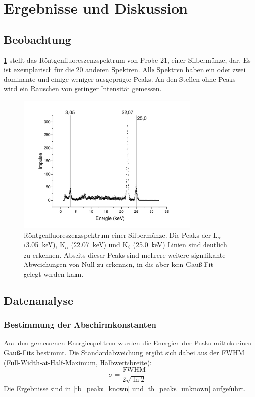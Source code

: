 \documentclass[
	a4paper,
	12pt,
	pagesize,
	ngerman
]{scrartcl}
\begin{document}
	\section{Ergebnisse und Diskussion}


	\subsection{Beobachtung} %
	\cref{fig_ag_plot} stellt das Röntgenfluoreszenzspektrum von Probe 21, einer Silbermünze, dar.
	Es ist exemplarisch für die 20 anderen Spektren.
	Alle Spektren haben ein oder zwei dominante und einige weniger ausgeprägte Peaks.
	An den Stellen ohne Peaks wird ein Rauschen von geringer Intensität gemessen.
	\begin{figure}[H]
		\includegraphics[width=0.8\textwidth]{images/Silbermuenze}
		\centering
		\caption{Röntgenfluoreszenzspektrum einer Silbermünze. Die Peaks der $\text{L}_\alpha$ (\SI{3,05}{\kilo \electronvolt}), $\text{K}_\alpha$ (\SI{22,07}{\kilo \electronvolt}) und $\text{K}_\beta$ (\SI{25,0}{\kilo \electronvolt}) Linien sind deutlich zu erkennen. Abseits dieser Peaks sind mehrere weitere signifikante Abweichungen von Null zu erkennen, in die aber kein Gauß-Fit gelegt werden kann.}
		\label{fig_ag_plot}
		\centering
	\end{figure}

	\subsection{Datenanalyse}
	\subsubsection{Bestimmung der Abschirmkonstanten}
	Aus den gemessenen Energiespektren wurden die Energien der Peaks mittels eines Gauß-Fits bestimmt.
	Die Standardabweichung ergibt sich dabei aus der FWHM (Full-Width-at-Half-Maximum, Halbwertsbreite):
	\begin{equation}
		\sigma = \frac{\text{FWHM}}{2\sqrt{\ln 2}}
	\end{equation}
	Die Ergebnisse sind in \cref{tb_peaks_known} und \cref{tb_peaks_unknown} aufgeführt.
\end{document}
